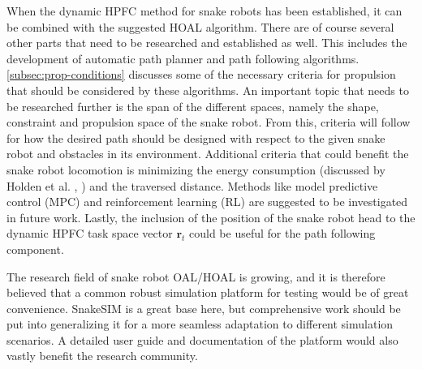 
When the dynamic HPFC method for snake robots has been established, it can be combined with the suggested HOAL algorithm. There are of course several other parts that need to be researched and established as well. This includes the development of automatic path planner and path following algorithms. \ref{subsec:prop-conditions} discusses some of the necessary criteria for propulsion that should be considered by these algorithms. An important topic that needs to be researched further is the span of the different spaces, namely the shape, constraint and propulsion space of the snake robot. From this, criteria will follow for how the desired path should be designed with respect to the given snake robot and obstacles in its environment. Additional criteria that could benefit the snake robot locomotion is minimizing the energy consumption (discussed by Holden et al. \cite{holden2013optimal}, \cite{holden2014optimal}) and the traversed distance. Methods like model predictive control (MPC) and reinforcement learning (RL) are suggested to be investigated in future work. Lastly, the inclusion of the position of the snake robot head to the dynamic HPFC task space vector $\mathbf{r}_t$ could be useful for the path following component.

The research field of snake robot OAL/HOAL is growing, and it is therefore believed that a common robust simulation platform for testing would be of great convenience. SnakeSIM is a great base here, but comprehensive work should be put into generalizing it for a more seamless adaptation to different simulation scenarios. A detailed user guide and documentation of the platform would also vastly benefit the research community.